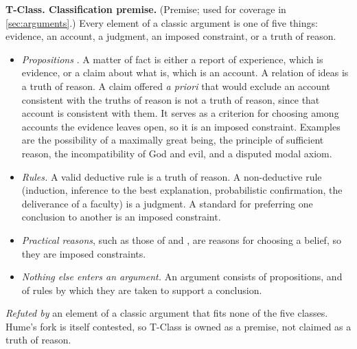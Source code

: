 \medskip\noindent\textbf{T-Class. Classification premise.}\label{item:TClass}
(Premise; used for coverage in \cref{sec:arguments}.) Every element of a classic argument is one
of five things: evidence, an account, a judgment, an imposed constraint, or a truth of reason.
\begin{itemize}
  \item \emph{Propositions} \citep[§4]{hume1748}.
        A matter of fact is either a report of experience, which is evidence, or a claim about
        what is, which is an account. A relation of ideas is a truth of reason. A claim offered
        \emph{a priori} that would exclude an account consistent with the truths of reason is not
        a truth of reason, since that account is consistent with them. It serves as a criterion for
        choosing among accounts the evidence leaves open, so it is an imposed constraint.
        Examples are the possibility of a maximally great being, the principle of
        sufficient reason, the incompatibility of God and evil, and a disputed modal axiom.
  \item \emph{Rules.} A valid deductive rule is a truth of reason. A non-deductive rule
        (induction, inference to the best explanation, probabilistic confirmation, the
        deliverance of a faculty) is a judgment. A standard for preferring one conclusion to
        another is an imposed constraint.
  \item \emph{Practical reasons}, such as those of \citet{pascal1670} and \citet{james1896},
        are reasons for choosing a belief, so they are imposed constraints.
  \item \emph{Nothing else enters an argument.} An argument consists of propositions, and of
        rules by which they are taken to support a conclusion.
\end{itemize}
\emph{Refuted by} an element of a classic argument that fits none of the five classes. Hume's fork
is itself contested, so T-Class is owned as a premise, not claimed as a truth of reason.
